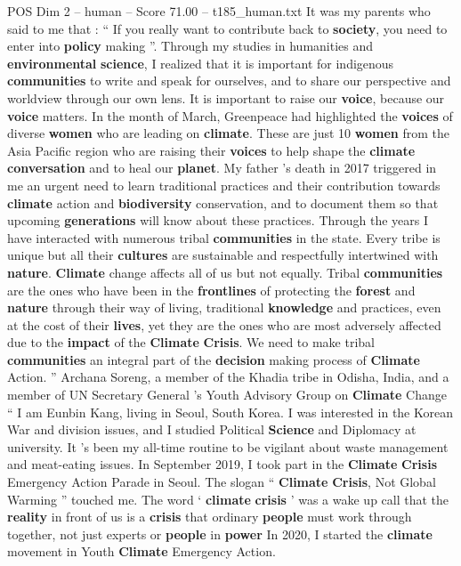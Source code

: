 \begin{textsample}{POS Dim 2 – human – Score 71.00 – t185\_human.txt}
It was my parents who said to me that : “ If you really want to contribute back to \textbf{society}, you need to enter into \textbf{policy} making ”.
Through my studies in humanities and \textbf{environmental} \textbf{science}, I realized that it is important for indigenous \textbf{communities} to write and speak for ourselves, and to share our perspective and worldview through our own lens.
It is important to raise our \textbf{voice}, because our \textbf{voice} matters.
In the month of March, Greenpeace had highlighted the \textbf{voices} of diverse \textbf{women} who are leading on \textbf{climate}.
These are just 10 \textbf{women} from the Asia Pacific region who are raising their \textbf{voices} to help shape the \textbf{climate} \textbf{conversation} and to heal our \textbf{planet}.
My father ’s death in 2017 triggered in me an urgent need to learn traditional practices and their contribution towards \textbf{climate} action and \textbf{biodiversity} conservation, and to document them so that upcoming \textbf{generations} will know about these practices.
Through the years I have interacted with numerous tribal \textbf{communities} in the state.
Every tribe is unique but all their \textbf{cultures} are sustainable and respectfully intertwined with \textbf{nature}. \textbf{Climate} change affects all of us but not equally.
Tribal \textbf{communities} are the ones who have been in the \textbf{frontlines} of protecting the \textbf{forest} and \textbf{nature} through their way of living, traditional \textbf{knowledge} and practices, even at the cost of their \textbf{lives}, yet they are the ones who are most adversely affected due to the \textbf{impact} of the \textbf{Climate} \textbf{Crisis}.
We need to make tribal \textbf{communities} an integral part of the \textbf{decision} making process of \textbf{Climate} Action. ” Archana Soreng, a member of the Khadia tribe in Odisha, India, and a member of UN Secretary General ’s Youth Advisory Group on \textbf{Climate} Change “ I am Eunbin Kang, living in Seoul, South Korea.
I was interested in the Korean War and division issues, and I studied Political \textbf{Science} and Diplomacy at university.
It ’s been my all-time routine to be vigilant about waste management and meat-eating issues.
In September 2019, I took part in the \textbf{Climate} \textbf{Crisis} Emergency Action Parade in Seoul.
The slogan “ \textbf{Climate} \textbf{Crisis}, Not Global Warming ” touched me.
The word ‘ \textbf{climate} \textbf{crisis} ’ was a wake up call that the \textbf{reality} in front of us is a \textbf{crisis} that ordinary \textbf{people} must work through together, not just experts or \textbf{people} in \textbf{power} In 2020, I started the \textbf{climate} movement in Youth \textbf{Climate} Emergency Action.

\end{textsample}
